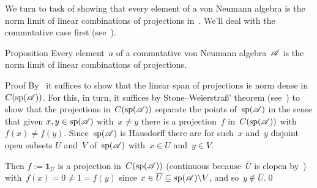 \documentclass[a]{subfiles}
\begin{document}
\begin{parsec}%
\begin{point}%
We turn
to task of showing that every element
of a von Neumann
algebra is the norm limit of linear combinations
of projections in~.
We'll deal with the  commutative case first
(see~).
\end{point}
\begin{point}{Proposition}%
Every element~$a$ of a commutative von Neumann algebra~$\mathscr{A}$
is the norm limit
of linear combinations of projections.
\begin{point}{Proof}%
By~
it suffices to show that the linear span
of projections is norm dense
in~$C(\mathrm{sp}(\mathscr{A}))$.
For this, in turn, it suffices 
by Stone--Weierstra\ss{}' theorem
(see~)
to show that the projections in~$C(\mathrm{sp}(\mathscr{A}))$
separate the points of~$\mathrm{sp}(\mathscr{A})$
in the sense
that given $x,y\in\mathrm{sp}(\mathscr{A})$
with~$x\neq y$
there is a projection~$f$ in~$C(\mathrm{sp}(\mathscr{A}))$
with~$f(x)\neq f(y)$.
Since~$\mathrm{sp}(\mathscr{A})$
is Hausdorff
there are for such~$x$ and~$y$
disjoint open subsets $U$ and~$V$
of~$\mathrm{sp}(\mathscr{A})$
with~$x\in U$ and~$y\in V$.

Then
$f:=\mathbf{1}_{\overline{U}}$
is a projection in~$C(\mathrm{sp}(\mathscr{A}))$
(continuous
because~$\overline{U}$
is clopen by~)
with~$f(x)=0\neq 1=f(y)$
since $x\in \overline{U}\subseteq \mathrm{sp}(\mathscr{A})\backslash V$,
and so~$y\notin \overline{U}$.\qed
\end{point}
\end{point}
\end{parsec}
\end{document}
